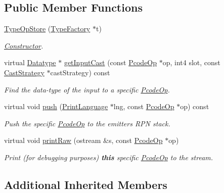 \subsection*{Public Member Functions}
\begin{DoxyCompactItemize}
\item 
\mbox{\hyperlink{class_type_op_store_abc4ff91f18d08d3d0aff9ab52c99fc07}{Type\+Op\+Store}} (\mbox{\hyperlink{class_type_factory}{Type\+Factory}} $\ast$t)
\begin{DoxyCompactList}\small\item\em \mbox{\hyperlink{class_constructor}{Constructor}}. \end{DoxyCompactList}\item 
virtual \mbox{\hyperlink{class_datatype}{Datatype}} $\ast$ \mbox{\hyperlink{class_type_op_store_a37da7d884a84478b4fa72451c47411c0}{get\+Input\+Cast}} (const \mbox{\hyperlink{class_pcode_op}{Pcode\+Op}} $\ast$op, int4 slot, const \mbox{\hyperlink{class_cast_strategy}{Cast\+Strategy}} $\ast$cast\+Strategy) const
\begin{DoxyCompactList}\small\item\em Find the data-\/type of the input to a specific \mbox{\hyperlink{class_pcode_op}{Pcode\+Op}}. \end{DoxyCompactList}\item 
virtual void \mbox{\hyperlink{class_type_op_store_a71bd20b40e4cf78ac2c6c909a7924e61}{push}} (\mbox{\hyperlink{class_print_language}{Print\+Language}} $\ast$lng, const \mbox{\hyperlink{class_pcode_op}{Pcode\+Op}} $\ast$op) const
\begin{DoxyCompactList}\small\item\em Push the specific \mbox{\hyperlink{class_pcode_op}{Pcode\+Op}} to the emitter\textquotesingle{}s R\+PN stack. \end{DoxyCompactList}\item 
virtual void \mbox{\hyperlink{class_type_op_store_a6cb2cfd46308c3b10ac0df9324f13115}{print\+Raw}} (ostream \&s, const \mbox{\hyperlink{class_pcode_op}{Pcode\+Op}} $\ast$op)
\begin{DoxyCompactList}\small\item\em Print (for debugging purposes) {\bfseries{this}} specific \mbox{\hyperlink{class_pcode_op}{Pcode\+Op}} to the stream. \end{DoxyCompactList}\end{DoxyCompactItemize}
\subsection*{Additional Inherited Members}


